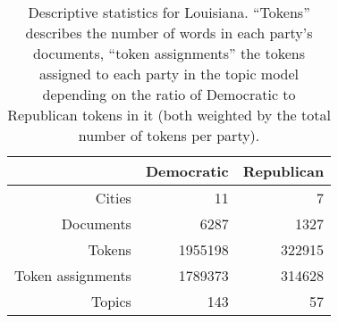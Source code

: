\begin{table}[ht]
\centering
\begin{tabular}{rrr}
  \hline
 & Democratic & Republican \\ 
  \hline
Cities & 11 & 7 \\ 
  Documents & 6287 & 1327 \\ 
  Tokens & 1955198 & 322915 \\ 
  Token assignments & 1789373 & 314628 \\ 
  Topics & 143 & 57 \\ 
   \hline
\end{tabular}
\caption{Descriptive statistics for Louisiana. ``Tokens'' describes the number
             of words in each party's documents, ``token assignments'' the tokens assigned
             to each party in the topic model depending on the ratio of Democratic to Republican 
             tokens in it (both weighted by the total number of tokens per party).} 
\label{tabDescriptiveLA}
\end{table}

